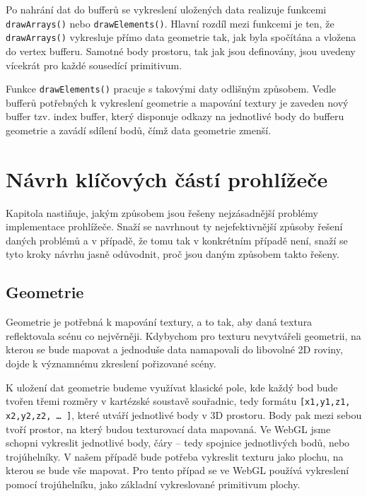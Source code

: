 Po nahrání dat do bufferů se vykreslení uložených data realizuje funkcemi \texttt{drawArrays()} nebo \texttt{drawElements()}. Hlavní rozdíl mezi funkcemi je ten, že \texttt{drawArrays()} vykresluje přímo data geometrie tak,  jak byla spočítána a vložena do vertex bufferu. Samotné body prostoru, tak jak jsou definovány, jsou uvedeny vícekrát pro každé sousedící primitivum.

Funkce \texttt{drawElements()} pracuje s takovými daty odlišným způsobem. Vedle bufferů potřebných k vykreslení geometrie a mapování textury je zaveden nový buffer tzv. index buffer, který disponuje odkazy na jednotlivé body do bufferu geometrie a zavádí sdílení bodů, čímž data geometrie zmenší. 

 



\newpage

\chapter{Návrh klíčových částí prohlížeče}
\label{chapter:3}
Kapitola nastiňuje, jakým způsobem jsou řešeny nejzásadnější problémy implementace prohlížeče. Snaží se navrhnout ty nejefektivnější způsoby řešení daných problémů a v případě, že tomu tak v konkrétním případě není, snaží se tyto  kroky návrhu jasně odůvodnit, proč jsou  daným způsobem takto řešeny.


\section{Geometrie}
Geometrie je potřebná k mapování textury, a to tak, aby daná textura reflektovala scénu co nejvěrněji. Kdybychom pro texturu nevytvářeli geometrii, na kterou se bude mapovat a jednoduše data namapovali do libovolné 2D roviny, dojde k významnému zkreslení pořizované scény.

K uložení dat geometrie budeme využívat klasické pole, kde každý bod bude tvořen třemi rozměry v kartézské soustavě souřadnic, tedy formátu \texttt{[x1,y1,z1, x2,y2,z2, … ]}, které utváří jednotlivé body v 3D prostoru. Body pak mezi sebou tvoří prostor, na který budou texturovací data  mapovaná. Ve WebGL jsme schopni vykreslit jednotlivé body, čáry – tedy spojnice jednotlivých bodů, nebo trojúhelníky. V našem případě bude potřeba vykreslit texturu jako plochu, na kterou se bude vše mapovat. Pro tento případ se ve WebGL používá vykreslení pomocí trojúhelníku, jako základní vykreslované primitivum plochy.


